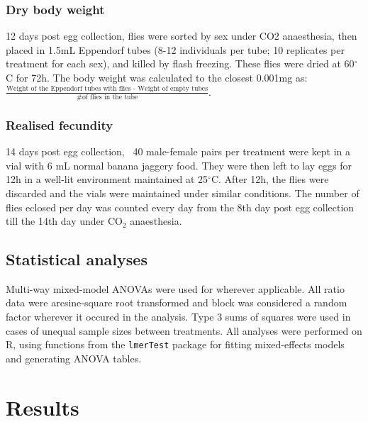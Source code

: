 \documentclass[12pt,onecolumn,twoside]{article}
\begin{document}
	\subsubsection{Dry body weight}
	12 days post egg collection, flies were sorted by sex under CO2 anaesthesia, then placed in 1.5mL Eppendorf tubes (8-12 individuals per tube; 10 replicates per treatment for each sex), and killed by flash freezing. These flies were dried at 60$^{\circ}$C for 72h. The body weight was calculated to the closest 0.001mg as: $\frac{\text{Weight of the Eppendorf tubes with flies - Weight of empty tubes}}{\text{\# of flies in the tube}}$.
	\subsubsection{Realised fecundity}
	14 days post egg collection, ~40 male-female pairs per treatment were kept in a vial with 6 mL normal banana jaggery food. They were then left to lay eggs for 12h in a well-lit environment maintained at 25$^{\circ}$C. After 12h, the flies were discarded and the vials were maintained under similar conditions. The number of flies eclosed per day was counted every day from the 8th day post egg collection till the 14th day under $\text{CO}_{2}$ anaesthesia.

	\subsection{Statistical analyses}
	Multi-way mixed-model ANOVAs were used for wherever applicable. All ratio data were arcsine-square root transformed and block was considered a random factor wherever it occured in the analysis. Type 3 sums of squares were used in cases of unequal sample sizes between treatments. All analyses were performed on R, using functions from the \texttt{lmerTest} package for fitting mixed-effects models and generating ANOVA tables.

	\section{Results}
\end{document}
